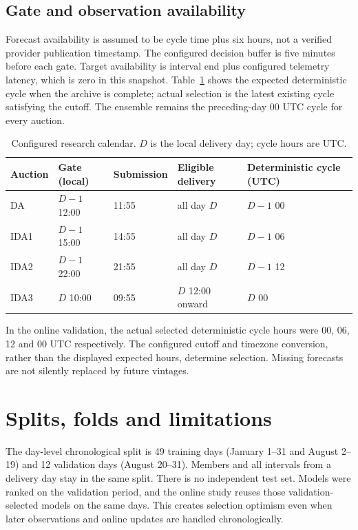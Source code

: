 \documentclass[11pt,a4paper]{article}
\begin{document}
\subsection{Gate and observation availability}\label{sec:gates}
Forecast availability is assumed to be cycle time plus six hours, not a verified provider publication timestamp. The configured decision buffer is five minutes before each gate. Target availability is interval end plus configured telemetry latency, which is zero in this snapshot. Table~\ref{tab:gates} shows the expected deterministic cycle when the archive is complete; actual selection is the latest existing cycle satisfying the cutoff. The ensemble remains the preceding-day 00 UTC cycle for every auction.
\begin{table}[H]\centering\small
\begin{tabular}{lllll}\toprule
Auction & Gate (local) & Submission & Eligible delivery & Deterministic cycle (UTC)\\\midrule
DA & $D-1$ 12:00 & 11:55 & all day $D$ & $D-1$ 00\\
IDA1 & $D-1$ 15:00 & 14:55 & all day $D$ & $D-1$ 06\\
IDA2 & $D-1$ 22:00 & 21:55 & all day $D$ & $D-1$ 12\\
IDA3 & $D$ 10:00 & 09:55 & $D$ 12:00 onward & $D$ 00\\
\bottomrule\end{tabular}\caption{Configured research calendar. $D$ is the local delivery day; cycle hours are UTC.}\label{tab:gates}\end{table}
In the online validation, the actual selected deterministic cycle hours were 00, 06, 12 and 00 UTC respectively. The configured cutoff and timezone conversion, rather than the displayed expected hours, determine selection. Missing forecasts are not silently replaced by future vintages.

\section{Splits, folds and limitations}\label{sec:splits}
The day-level chronological split is 49 training days (January 1--31 and August 2--19) and 12 validation days (August 20--31). Members and all intervals from a delivery day stay in the same split. There is no independent test set. Models were ranked on the validation period, and the online study reuses those validation-selected models on the same days. This creates selection optimism even when later observations and online updates are handled chronologically.
\end{document}
